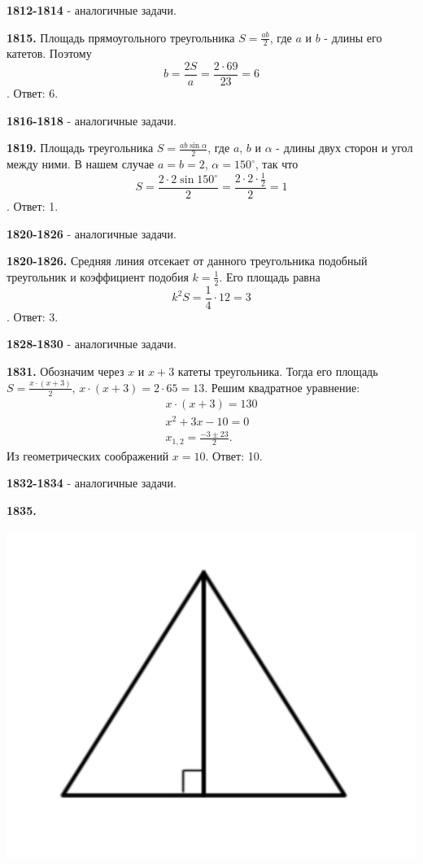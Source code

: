 \textbf{1812-1814} - аналогичные задачи.

\textbf{1815.}  Площадь прямоугольного треугольника $S = \frac{ab}{2}$, где $a$ и \newline $b$ - длины его катетов. Поэтому
\[
b = \frac{2S}{a} = \frac{2 \cdot 69}{23} = 6
\]. \null \hspace*{\fill} Ответ: 6.

\textbf{1816-1818} - аналогичные задачи.

\textbf{1819.} Площадь треугольника $S = \frac{ab\sin{\alpha}}{2}$, где $a$, $b$ и $\alpha$ - длины двух сторон и угол между ними. В нашем случае $a = b = 2$, $\alpha = 150^\circ$, так что
\[
S = \frac{2 \cdot 2 \sin{150^\circ}}{2} = \frac{2 \cdot 2 \cdot \frac{1}{2}}{2} = 1
\].\null \hspace*{\fill} Ответ: 1.

\textbf{1820-1826} - аналогичные задачи.

\textbf{1820-1826.} Средняя линия отсекает от данного треугольника подобный треугольник и коэффициент подобия $k = \frac{1}{2}$. Его площадь равна 
\[
k^2S=\frac{1}{4}\cdot12=3
\].\null \hspace*{\fill} Ответ: 3.

\textbf{1828-1830} - аналогичные задачи.

\textbf{1831.} Обозначим через $x$ и $x+3$ катеты треугольника. Тогда его площадь $S = \frac{x\cdot(x+3)}{2}$, $x\cdot(x+3)=2\cdot65=13$. Решим квадратное уравнение:
\[
\begin{aligned}
	x\cdot(x+3)=130 \\
	 x^2+3x-10=0 \\
	 x_{1,2}=\frac{-3\pm 23}{2}.
\end{aligned}
\]
Из геометрических соображений $x =10$. \newline \null \hspace*{\fill} Ответ: 10.

\textbf{1832-1834} - аналогичные задачи.

\textbf{1835.}

{\centering \includegraphics[width=0.4\linewidth]{Geometry/Content/18.png}
	
}

